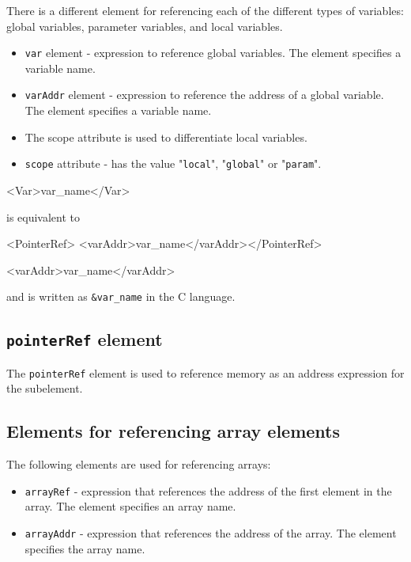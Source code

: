 There is a different element for referencing each of the different types of variables: global variables, parameter variables, and local variables.

\begin{itemize}
\item {\tt var} element - expression to reference global variables.
The element specifies a variable name.
\item {\tt varAddr} element - expression to reference the address of a global variable.
The element specifies a variable name.
\item The scope attribute is used to differentiate local variables.
\item {\tt scope} attribute - has the value "{\tt local}", "{\tt global}" or "{\tt param}".
\end{itemize}
\vspace{1mm}

\begin{XcodeMLExample}
<Var>var_name</Var> 
\end{XcodeMLExample}

is equivalent to
\vspace{2mm}

\begin{XcodeMLExample}
<PointerRef> <varAddr>var_name</varAddr></PointerRef>
\end{XcodeMLExample}
\vspace{1mm}

\begin{XcodeMLExample}
<varAddr>var_name</varAddr>
\end{XcodeMLExample}

and is written as {\tt \&var\_name} in the C language.


\subsection{ {\tt pointerRef} element}

The {\tt pointerRef} element is used to reference memory as an address expression for the subelement.


\subsection{Elements for referencing array elements}

The following elements are used for referencing arrays:

\begin{itemize}
\item {\tt arrayRef} - expression that references the address of the first element in the array. The element specifies an array name.
\item {\tt arrayAddr} - expression that references the address of the array. The element specifies the array name.
\end{itemize}

